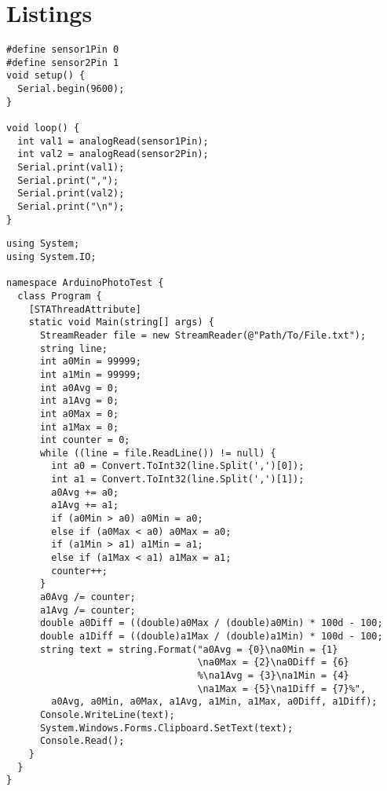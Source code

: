 \appendix
\label{appendix_start}

\chapter{Listings}

\lstset{language=C}
\begin{lstlisting}[label = lst:arduinoPhotoCode, caption = Arduino program for photoresistor tests]
#define sensor1Pin 0
#define sensor2Pin 1
void setup() {
  Serial.begin(9600);
}

void loop() {
  int val1 = analogRead(sensor1Pin);
  int val2 = analogRead(sensor2Pin);
  Serial.print(val1);
  Serial.print(",");
  Serial.print(val2);
  Serial.print("\n");
}
\end{lstlisting}

\lstset{language=[Sharp]C}
\begin{lstlisting}[label = lst:cShPhotoCode, caption = C\# data processing code, showstringspaces=false]
using System;
using System.IO;

namespace ArduinoPhotoTest {
  class Program {
    [STAThreadAttribute]
    static void Main(string[] args) {
      StreamReader file = new StreamReader(@"Path/To/File.txt");
      string line;
      int a0Min = 99999;
      int a1Min = 99999;
      int a0Avg = 0;
      int a1Avg = 0;
      int a0Max = 0;
      int a1Max = 0;
      int counter = 0;
      while ((line = file.ReadLine()) != null) {
        int a0 = Convert.ToInt32(line.Split(',')[0]);
        int a1 = Convert.ToInt32(line.Split(',')[1]);
        a0Avg += a0;
        a1Avg += a1;
        if (a0Min > a0) a0Min = a0;
        else if (a0Max < a0) a0Max = a0;
        if (a1Min > a1) a1Min = a1;
        else if (a1Max < a1) a1Max = a1;
        counter++;
      }
      a0Avg /= counter;
      a1Avg /= counter;
      double a0Diff = ((double)a0Max / (double)a0Min) * 100d - 100;
      double a1Diff = ((double)a1Max / (double)a1Min) * 100d - 100;
      string text = string.Format("a0Avg = {0}\na0Min = {1}
                                  \na0Max = {2}\na0Diff = {6}
                                  %\na1Avg = {3}\na1Min = {4}
                                  \na1Max = {5}\na1Diff = {7}%",
        a0Avg, a0Min, a0Max, a1Avg, a1Min, a1Max, a0Diff, a1Diff);
      Console.WriteLine(text);
      System.Windows.Forms.Clipboard.SetText(text);
      Console.Read();
    }
  }
}
\end{lstlisting}
